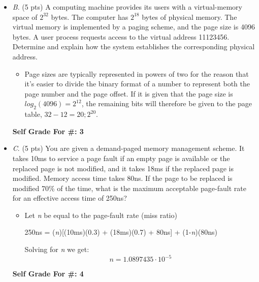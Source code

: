 \documentclass[conference]{IEEEtran}
\begin{document}
\begin{itemize}
	\item \textit{B}. (5 pts) A computing machine provides its users with a virtual-memory space of $2^{32}$ bytes.
	The computer has $2^{18}$ bytes of physical memory. The virtual memory is implemented by a
	paging scheme, and the page size is 4096 bytes. A user process requests access to the virtual
	address 11123456. Determine and explain how the system establishes the corresponding physical
	address.
	\begin{itemize} 
		\item Page sizes are typically represented in powers of two for the reason that it's easier to divide the binary format of a number to represent both the page number and the page offset. If it is given that the page size is $log_{2}(4096) = 2^{12}$, the remaining bits will therefore be given to the page table, $32 - 12 = 20; 2^{20}$. 
	\end{itemize}

\begin{center}
\textbf{Self Grade For \#: 3}
\end{center}
\end{itemize}


\begin{itemize}
	\item \textit{C}. (5 pts) You are given a demand-paged memory management scheme. It takes 10ms to service
	a page fault if an empty page is available or the replaced page is not modified, and it takes 18ms
	if the replaced page is modified. Memory access time takes 80ns. If the page to be replaced is
	modified 70\% of the time, what is the maximum acceptable page-fault rate for an effective
	access time of 250ns?
	\begin{itemize} 
		\item Let \textit{n} be equal to the page-fault rate (miss ratio)
		\begin{center}
		250ns = (\textit{n})[(10ms)(0.3) + (18ms)(0.7) + 80ns] + (1-\textit{n})(80ns) \\
		\end{center}
		Solving for \textit{n} we get: \\
		\begin{equation}
		n = 1.0897435\cdot10^{-5}
		\end{equation}
	\end{itemize}
	
	\begin{center}
		\textbf{Self Grade For \#: 4}
	\end{center}
\end{itemize}
\end{document}
